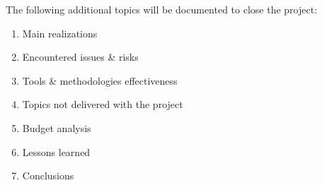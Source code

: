 The following additional topics will be documented to close the project:
	\begin{enumerate}
		\item Main realizations
		\item Encountered issues \& risks
		\item Tools \& methodologies effectiveness
		\item Topics not delivered with the project
		\item Budget analysis
		\item Lessons learned
		\item Conclusions
	\end {enumerate}